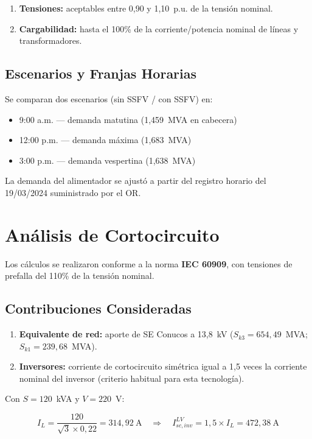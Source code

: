 \begin{enumerate}
    \item \textbf{Tensiones:} aceptables entre 0,90 y 1,10~p.u. de la tensión nominal.
    \item \textbf{Cargabilidad:} hasta el 100\% de la corriente/potencia nominal de líneas y transformadores.
\end{enumerate}

\subsection{Escenarios y Franjas Horarias}

Se comparan dos escenarios (sin SSFV / con SSFV) en:
\begin{itemize}
    \item 9:00 a.m. --- demanda matutina (1,459~MVA en cabecera)
    \item 12:00 p.m. --- demanda máxima (1,683~MVA)
    \item 3:00 p.m. --- demanda vespertina (1,638~MVA)
\end{itemize}

La demanda del alimentador se ajustó a partir del registro horario del 19/03/2024 suministrado por el OR.

\section{Análisis de Cortocircuito}

Los cálculos se realizaron conforme a la norma \textbf{IEC 60909}, con tensiones de prefalla del 110\% de la tensión nominal.

\subsection{Contribuciones Consideradas}

\begin{enumerate}
    \item \textbf{Equivalente de red:} aporte de SE Conucos a 13,8~kV ($S_{k3}=654,49$~MVA; $S_{k1}=239,68$~MVA).
    \item \textbf{Inversores:} corriente de cortocircuito simétrica igual a 1,5 veces la corriente nominal del inversor (criterio habitual para esta tecnología).
\end{enumerate}

Con $S=120$~kVA y $V=220$~V:

\begin{equation}
I_{L} = \frac{120}{\sqrt{3}\times 0{,}22} = 314{,}92~\text{A}
\quad\Rightarrow\quad
I_{sc,inv}^{LV} = 1{,}5\times I_{L} = 472{,}38~\text{A}
\end{equation}

